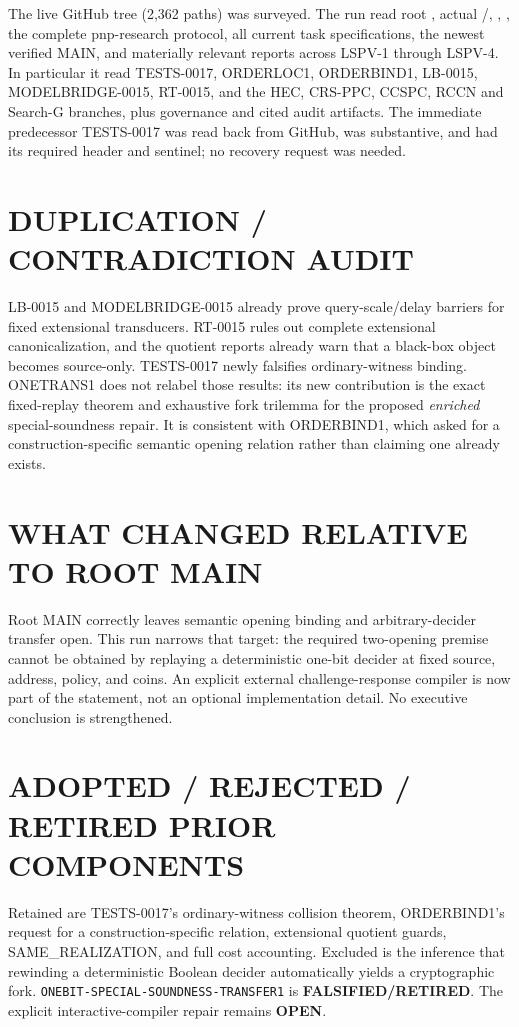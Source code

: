 \documentclass[11pt]{article}
\newcommand{\st}[1]{\textbf{#1}}
\begin{document}
The live GitHub tree (2,362 paths) was surveyed.  The run read root
, actual /, ,
, the complete pnp-research protocol, all current task
specifications, the newest verified MAIN, and materially relevant reports
across LSPV-1 through LSPV-4.  In particular it read TESTS-0017, ORDERLOC1,
ORDERBIND1, LB-0015, MODELBRIDGE-0015, RT-0015, and the HEC, CRS-PPC, CCSPC,
RCCN and Search-G branches, plus governance and cited audit artifacts.  The
immediate predecessor TESTS-0017 was read back from GitHub, was substantive,
and had its required header and sentinel; no recovery request was needed.

\section*{DUPLICATION / CONTRADICTION AUDIT}

LB-0015 and MODELBRIDGE-0015 already prove query-scale/delay barriers for
fixed extensional transducers.  RT-0015 rules out complete extensional
canonicalization, and the quotient reports already warn that a black-box
object becomes source-only.  TESTS-0017 newly falsifies ordinary-witness
binding.  ONETRANS1 does not relabel those results: its new contribution is
the exact fixed-replay theorem and exhaustive fork trilemma for the proposed
\emph{enriched} special-soundness repair.  It is consistent with ORDERBIND1,
which asked for a construction-specific semantic opening relation rather than
claiming one already exists.

\section*{WHAT CHANGED RELATIVE TO ROOT MAIN}

Root MAIN correctly leaves semantic opening binding and arbitrary-decider
transfer open.  This run narrows that target: the required two-opening premise
cannot be obtained by replaying a deterministic one-bit decider at fixed
source, address, policy, and coins.  An explicit external challenge-response
compiler is now part of the statement, not an optional implementation detail.
No executive conclusion is strengthened.

\section*{ADOPTED / REJECTED / RETIRED PRIOR COMPONENTS}

Retained are TESTS-0017's ordinary-witness collision theorem, ORDERBIND1's
request for a construction-specific relation, extensional quotient guards,
SAME\_REALIZATION, and full cost accounting.  Excluded is the inference that
rewinding a deterministic Boolean decider automatically yields a cryptographic
fork.  \texttt{ONEBIT-SPECIAL-SOUNDNESS-TRANSFER1} is
\st{FALSIFIED/RETIRED}.  The explicit interactive-compiler repair remains
\st{OPEN}.
\end{document}
